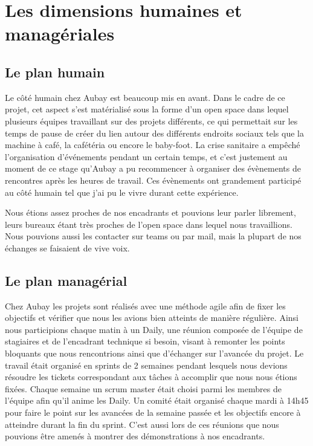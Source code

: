 \documentclass[11pt]{article}
\begin{document}
  \pagebreak

  \section{Les dimensions humaines et managériales} 
    \subsection{Le plan humain}
      Le côté humain chez Aubay est beaucoup mis en avant. Dans le cadre de ce projet, cet aspect s'est 
      matérialisé sous la forme d'un open space dans lequel plusieurs équipes travaillant sur des projets 
      différents, ce qui permettait sur les temps de pause de créer du lien autour des différents endroits 
      sociaux tels que la machine à café, la cafétéria ou encore le baby-foot. La crise sanitaire a empêché
      l'organisation d'événements pendant un certain temps, et c'est justement au moment de ce stage qu'Aubay 
      a pu recommencer à organiser des évènements de rencontres après les heures de travail. Ces évènements 
      ont grandement participé au côté humain tel que j'ai pu le vivre durant cette expérience.

      Nous étions assez proches de nos encadrants et pouvions leur parler librement, leurs bureaux étant très 
      proches de l'open space dans lequel nous travaillions. Nous pouvions aussi les contacter sur teams ou 
      par mail, mais la plupart de nos échanges se faisaient de vive voix.

    \subsection{Le plan managérial}
      Chez Aubay les projets sont réalisés avec une méthode agile afin de fixer les objectifs et vérifier que nous les avions bien atteints
      de manière régulière. Ainsi nous participions chaque matin à un Daily, une réunion
      composée de l'équipe de stagiaires et de l'encadrant technique si besoin, 
      visant à remonter les points bloquants que nous rencontrions ainsi que d'échanger sur l'avancée du projet.
      Le travail était organisé en sprints de 2 semaines pendant lesquels nous devions résoudre les tickets
      correspondant aux tâches à accomplir que nous nous étions fixées. Chaque semaine un scrum master était
      choisi parmi les membres de l'équipe afin qu'il anime les Daily. Un comité était organisé chaque mardi
      à 14h45 pour faire le point sur les avancées de la semaine passée et les objectifs encore à atteindre
      durant la fin du sprint. C'est aussi lors de ces réunions que nous pouvions être amenés à montrer des 
      démonstrations à nos encadrants. 
\end{document}
